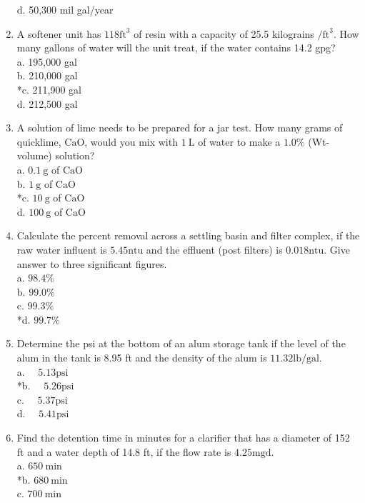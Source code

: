 \begin{enumerate}
d. 50,300 mil gal/year
\item A softener unit has $118 \mathrm{ft}^{3}$ of resin with a capacity of 25.5 kilograins $/ \mathrm{ft}^{3}$. How many gallons of water will the unit treat, if the water contains 14.2 gpg?\\
a. 195,000 gal\\
b. 210,000 gal\\
*c. 211,900 gal\\
d. 212,500 gal\\
\item A solution of lime needs to be prepared for a jar test. How many grams of quicklime, $\mathrm{CaO}$, would you mix with $1 \mathrm{~L}$ of water to make a $1.0 \%$ (Wt-volume) solution?\\
a. $0.1 \mathrm{~g}$ of $\mathrm{CaO}$\\
b. $1 \mathrm{~g}$ of $\mathrm{CaO}$\\
*c. $10 \mathrm{~g}$ of $\mathrm{CaO}$\\
d. $100 \mathrm{~g}$ of $\mathrm{CaO}$\\
\item Calculate the percent removal across a settling basin and filter complex, if the raw water influent is $5.45 \mathrm{ntu}$ and the effluent (post filters) is $0.018 \mathrm{ntu}$. Give answer to three significant figures.\\
a. $98.4 \%$\\
b. $99.0 \%$\\
c. $99.3 \%$\\
*d. $99.7 \%$\\
\item Determine the psi at the bottom of an alum storage tank if the level of the alum in the tank is 8.95 ft and the density of the alum is $11.32 \mathrm{lb} / \mathrm{gal}$.\\
a. $\quad 5.13 \mathrm{psi}$\\
*b. $\quad 5.26 \mathrm{psi}$\\
c. $\quad 5.37 \mathrm{psi}$\\
d. $\quad 5.41 \mathrm{psi}$\\
\item Find the detention time in minutes for a clarifier that has a diameter of 152 ft and a water depth of 14.8 ft, if the flow rate is $4.25 \mathrm{mgd}$.\\
a. $650 \mathrm{~min}$\\
*b. $680 \mathrm{~min}$\\
c. $700 \mathrm{~min}$\\

\end{enumerate}
